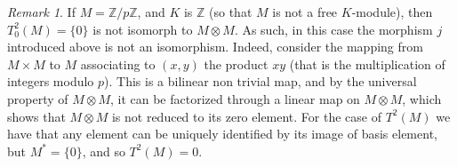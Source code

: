 \documentclass{report}
\theoremstyle{definition}
\theoremstyle{remark}
\newtheorem{remark}{Remark}
\begin{document}
\begin{remark}
    If $M = \mathbb{Z}/{p\mathbb{Z}}$, and $K$ is $\mathbb{Z}$ (so that $M$ is not a free $K$-module), then $T^2_0(M) = \{0\}$ is not isomorph to $M \otimes M$. As such, in this case the morphism $j$ introduced above is not an isomorphism. 
Indeed, consider the mapping from $M\times M$ to $M$ associating to $(x,y)$ the product $xy$ (that is the multiplication of integers modulo $p$). This is a bilinear non trivial map, and by the universal property of $M\otimes M$, it can be factorized through a linear map on $M\otimes M$, which shows that $M\otimes M$ is not reduced to its zero element. For the case of $T^2(M)$ we have that any element can be uniquely identified by its image of basis element, but $M^* = \{0\}$, and so $T^2(M) = 0$.

    
 
  
\end{remark}


\bigskip
\end{document}

